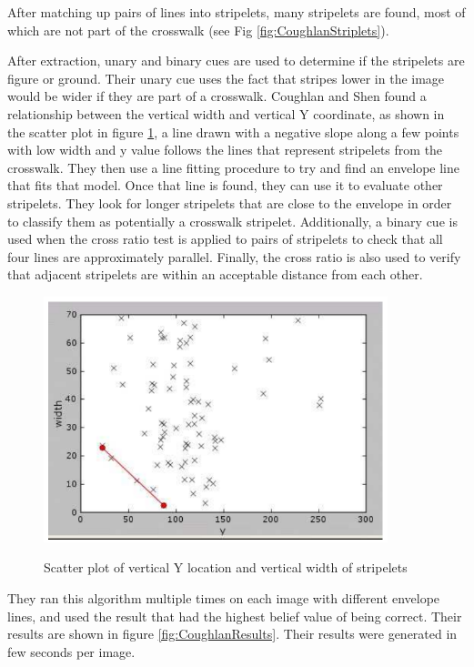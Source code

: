 \documentclass[12pt]{ucthesis}
\newcommand{\captionfonts}{\small\bf\ssp}
\begin{document}
After matching up pairs of lines into stripelets, many stripelets are found, most of which are not part of the crosswalk (see Fig \ref{fig:CoughlanStriplets}).

After extraction, unary and binary cues are used to determine if the stripelets are figure or ground. Their unary cue uses the fact that stripes lower in the image would be wider if they are part of a crosswalk. Coughlan and Shen found a relationship between the vertical width and vertical Y coordinate, as shown in the scatter plot in figure \ref{fig:CoughlanScatter}, a line drawn with a negative slope along a few points with low width and y value follows the lines that represent stripelets from the crosswalk. They then use a line fitting procedure to try and find an envelope line that fits that model. Once that line is found, they can use it to evaluate other stripelets. They look for longer stripelets that are close to the envelope in order to classify them as potentially a crosswalk stripelet. Additionally, a binary cue is used when the cross ratio test is applied to pairs of stripelets to check that all four lines are approximately parallel. Finally, the cross ratio is also used to verify that adjacent stripelets are within an acceptable distance from each other. 

\begin{figure}[h!]
\begin{center}
\includegraphics[width=10cm]{CoughlanScatter.png}
\captionfonts
\caption[Coughlan Scatterplot of Y and Vertical Width]{Scatter plot of vertical Y location and vertical width of stripelets \cite{Coughlan2006}}
\label{fig:CoughlanScatter}
\end{center}
\end{figure}

They ran this algorithm multiple times on each image with different envelope lines, and used the result that had the highest belief value of being correct. Their results are shown in figure \ref{fig:CoughlanResults}. Their results were generated in few seconds per image. 
\end{document}
